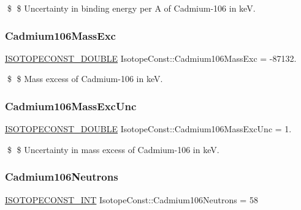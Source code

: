 \$ \$ Uncertainty in binding energy per A of Cadmium-\/106 in keV. \mbox{\label{group___isotope_const-_cadmium-_cd106_ga6b23f2e6a3a927332891df41776713bb}} 
\subsubsection{\texorpdfstring{Cadmium106\+Mass\+Exc}{Cadmium106MassExc}}
{\footnotesize\ttfamily \mbox{\hyperlink{group___isotope_const-_macros_ga8f45a7272ce02c0b4c65c44636ed719a}{I\+S\+O\+T\+O\+P\+E\+C\+O\+N\+S\+T\+\_\+\+D\+O\+U\+B\+LE}} Isotope\+Const\+::\+Cadmium106\+Mass\+Exc = -\/87132.}

\$ \$ Mass excess of Cadmium-\/106 in keV. \mbox{\label{group___isotope_const-_cadmium-_cd106_ga36d6f0f5d70f97068ba72bd429fad716}} 
\subsubsection{\texorpdfstring{Cadmium106\+Mass\+Exc\+Unc}{Cadmium106MassExcUnc}}
{\footnotesize\ttfamily \mbox{\hyperlink{group___isotope_const-_macros_ga8f45a7272ce02c0b4c65c44636ed719a}{I\+S\+O\+T\+O\+P\+E\+C\+O\+N\+S\+T\+\_\+\+D\+O\+U\+B\+LE}} Isotope\+Const\+::\+Cadmium106\+Mass\+Exc\+Unc = 1.}

\$ \$ Uncertainty in mass excess of Cadmium-\/106 in keV. \mbox{\label{group___isotope_const-_cadmium-_cd106_ga14c1b85f5c025a066803f56703e97f45}} 
\subsubsection{\texorpdfstring{Cadmium106\+Neutrons}{Cadmium106Neutrons}}
{\footnotesize\ttfamily \mbox{\hyperlink{group___isotope_const-_macros_ga5f18360b3e99483a35c32d789e62621c}{I\+S\+O\+T\+O\+P\+E\+C\+O\+N\+S\+T\+\_\+\+I\+NT}} Isotope\+Const\+::\+Cadmium106\+Neutrons = 58}

